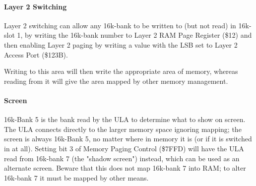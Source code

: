 \paragraph{Layer 2 Switching}
Layer 2 switching can allow any 16k-bank to be written to (but not
read) in 16k-slot 1, by writing the 16k-bank number to Layer 2 RAM
Page Register (\$12) and then enabling Layer 2 paging by writing a
value with the LSB set to Layer 2 Access Port (\$123B).

Writing to this area will then write the appropriate area of memory,
whereas reading from it will give the area mapped by other memory
management.

\paragraph{Screen}
16k-Bank 5 is the bank read by the ULA to determine what to show on
screen. The ULA connects directly to the larger memory space ignoring
mapping; the screen is always 16k-Bank 5, no matter where in memory it
is (or if it is switched in at all). Setting bit 3 of Memory Paging
Control (\$7FFD) will have the ULA read from 16k-bank 7 (the "shadow
screen") instead, which can be used as an alternate screen. Beware
that this does not map 16k-bank 7 into RAM; to alter 16k-bank 7 it
must be mapped by other means.
